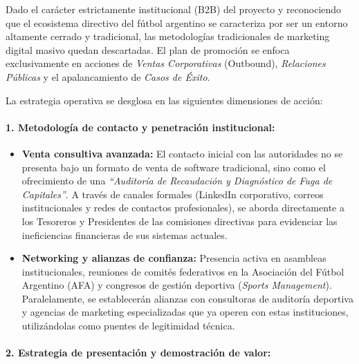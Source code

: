 Dado el carácter estrictamente institucional (B2B) del proyecto y reconociendo que el ecosistema directivo del fútbol argentino se caracteriza por ser un entorno altamente cerrado y tradicional, las metodologías tradicionales de marketing digital masivo quedan descartadas. El plan de promoción se enfoca exclusivamente en acciones de \textit{Ventas Corporativas} (Outbound), \textit{Relaciones Públicas} y el apalancamiento de \textit{Casos de Éxito}.

La estrategia operativa se desglosa en las siguientes dimensiones de acción:

\paragraph{1. Metodología de contacto y penetración institucional:}

\begin{itemize}
    \item \textbf{Venta consultiva avanzada:} El contacto inicial con las autoridades no se presenta bajo un formato de venta de software tradicional, sino como el ofrecimiento de una \textit{``Auditoría de Recaudación y Diagnóstico de Fuga de Capitales''}. A través de canales formales (LinkedIn corporativo, correos institucionales y redes de contactos profesionales), se aborda directamente a los Tesoreros y Presidentes de las comisiones directivas para evidenciar las ineficiencias financieras de sus sistemas actuales.
    \item \textbf{Networking y alianzas de confianza:} Presencia activa en asambleas institucionales, reuniones de comités federativos en la Asociación del Fútbol Argentino (AFA) y congresos de gestión deportiva (\textit{Sports Management}). Paralelamente, se establecerán alianzas con consultoras de auditoría deportiva y agencias de marketing especializadas que ya operen con estas instituciones, utilizándolas como puentes de legitimidad técnica.
\end{itemize}

\newpage

\paragraph{2. Estrategia de presentación y demostración de valor:}


